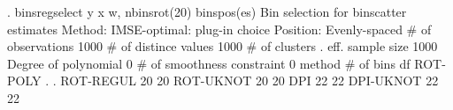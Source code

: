 . binsregselect y x w, nbinsrot(20) binspos(es)
{\smallskip}
Bin selection for binscatter estimates
Method: IMSE-optimal: plug-in choice
Position: Evenly-spaced
{\smallskip}
          \# of observations {\VBAR}    1000
       \# of distince values {\VBAR}    1000
              \# of clusters {\VBAR}       .
           eff. sample size {\VBAR}    1000
       Degree of polynomial {\VBAR}       0
 \# of smoothness constraint {\VBAR}       0
{\smallskip}
    method    {\VBAR}   \# of bins {\VBAR}     df   
   ROT-POLY   {\VBAR}       .     {\VBAR}      .
   ROT-REGUL  {\VBAR}      20     {\VBAR}     20
   ROT-UKNOT  {\VBAR}      20     {\VBAR}     20
      DPI     {\VBAR}      22     {\VBAR}     22
   DPI-UKNOT  {\VBAR}      22     {\VBAR}     22
